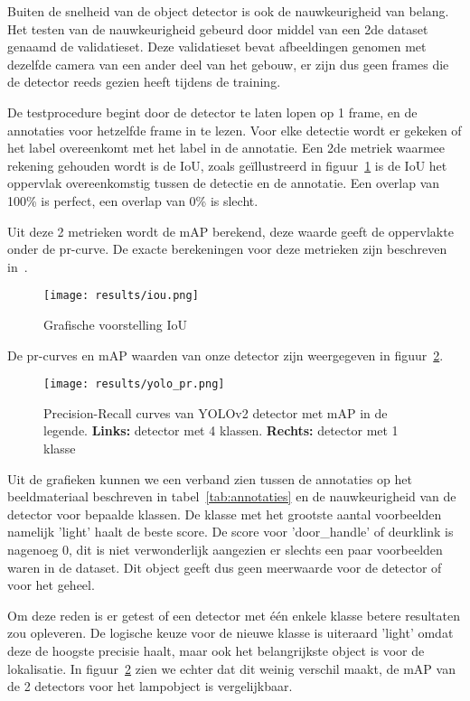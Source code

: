 Buiten de snelheid van de object detector is ook de nauwkeurigheid van belang.
Het testen van de nauwkeurigheid gebeurd door middel van een 2de dataset genaamd de validatieset. Deze validatieset bevat afbeeldingen genomen met dezelfde camera
van een ander deel van het gebouw, er zijn dus geen frames die de detector reeds gezien heeft tijdens de training.

De testprocedure begint door de detector te laten lopen op 1 frame, en de annotaties voor hetzelfde frame in te lezen.
Voor elke detectie wordt er gekeken of het label overeenkomt met het label in de annotatie.
Een 2de metriek waarmee rekening gehouden wordt is de \gls{IoU}, zoals ge\"{i}llustreerd in figuur~\ref{fig:iou} is de \gls{IoU}
het oppervlak overeenkomstig tussen de detectie en de annotatie.
Een overlap van 100\% is perfect, een overlap van 0\% is slecht.

Uit deze 2 metrieken wordt de \gls{mAP} berekend, deze waarde geeft de oppervlakte onder de pr-curve.
De exacte berekeningen voor deze metrieken zijn beschreven in~\cite{everingham2010pascal}.

\begin{figure}[h]
    \centering
    \texttt{[image: results/iou.png]}
    \caption{Grafische voorstelling IoU}
    \label{fig:iou}
\end{figure}

De pr-curves en \gls{mAP} waarden van onze detector zijn weergegeven in figuur~\ref{fig:yolo_pr}.

\begin{figure}[h]
    \texttt{[image: results/yolo\_pr.png]}
    \caption{Precision-Recall curves van YOLOv2 detector met mAP in de legende. \textbf{Links:} detector met 4 klassen. \textbf{Rechts:} detector met 1 klasse}
    \label{fig:yolo_pr}
\end{figure}

Uit de grafieken kunnen we een verband zien tussen de annotaties op het beeldmateriaal beschreven in tabel~\ref{tab:annotaties} en de nauwkeurigheid van
de detector voor bepaalde klassen. De klasse met het grootste aantal voorbeelden namelijk 'light' haalt de beste score.
De score voor 'door\_handle' of deurklink is nagenoeg 0, dit is niet verwonderlijk aangezien er slechts een paar voorbeelden waren in de dataset.
Dit object geeft dus geen meerwaarde voor de detector of voor het geheel.

Om deze reden is er getest of een detector met \'{e}\'{e}n enkele klasse betere resultaten zou opleveren.
De logische keuze voor de nieuwe klasse is uiteraard 'light' omdat deze de hoogste precisie haalt, maar ook het belangrijkste object is voor de lokalisatie.
In figuur~\ref{fig:yolo_pr} zien we echter dat dit weinig verschil maakt, de \gls{mAP} van de 2 detectors voor het lampobject is vergelijkbaar.

